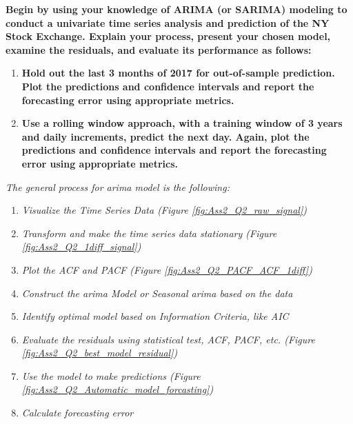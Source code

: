 \item \textbf{Begin by using your knowledge of ARIMA (or SARIMA) modeling to conduct a univariate time series analysis and prediction of the NY Stock Exchange. Explain your process, present your chosen model, examine the residuals, and evaluate its performance as follows:} 
\begin{enumerate}
\item \textbf{Hold out the last 3 months of 2017 for out-of-sample prediction. Plot the predictions and confidence intervals and report the forecasting error using appropriate metrics.}
\item \textbf{Use a rolling window approach, with a training window of 3 years and daily increments, predict the next day. Again, plot the predictions and confidence intervals and report the forecasting error using appropriate metrics.}
\end{enumerate}






\textit{ The general process for \gls{arima} model is the following:}
\begin{enumerate}
\item \textit{Visualize the Time Series Data (Figure
        \ref{fig:Ass2_Q2_raw_signal})}
\item \textit{Transform and make the time series data stationary (Figure
        \ref{fig:Ass2_Q2_1diff_signal})}
\item \textit{Plot the \gls{ACF} and \gls{PACF} (Figure
        \ref{fig:Ass2_Q2_PACF_ACF_1diff})}
\item \textit{Construct the \gls{arima} Model or Seasonal \gls{arima} based on the data }
\item \textit{Identify optimal model based on Information Criteria, like \gls{AIC} }
\item \textit{Evaluate the residuals using statistical test, \gls{ACF}, \gls{PACF}, etc. (Figure
         \ref{fig:Ass2_Q2_best_model_residual})}
\item \textit{Use the model to make predictions (Figure
        \ref{fig:Ass2_Q2_Automatic_model_forcasting})}
\item \textit{Calculate forecasting error}


\end{enumerate}


